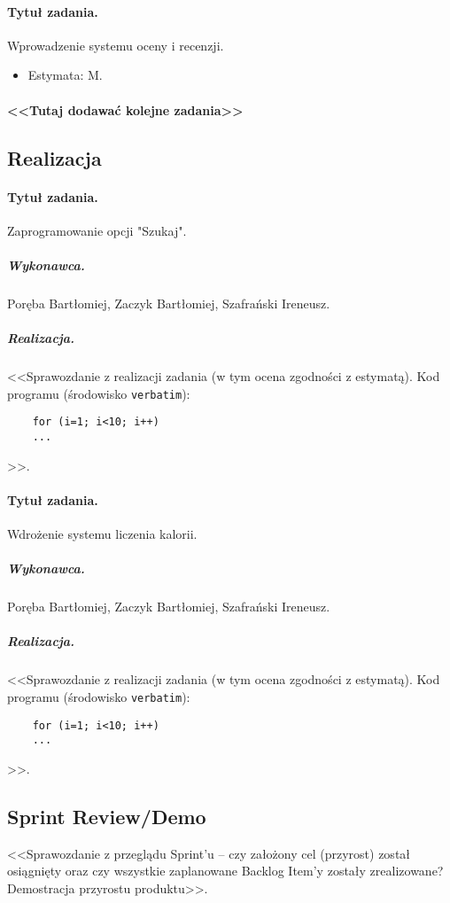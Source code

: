 \documentclass[a4paper]{article}
\begin{document}
	\paragraph{Tytuł zadania.} Wprowadzenie systemu oceny i recenzji.
	\begin{itemize}
		\item Estymata: M.
	\end{itemize}
	
	\paragraph{<<Tutaj dodawać kolejne zadania>>}
	
	\subsection{Realizacja}
	
	\paragraph{Tytuł zadania.} Zaprogramowanie opcji "Szukaj".
	\subparagraph{Wykonawca.} Poręba Bartłomiej, Zaczyk Bartłomiej, Szafrański Ireneusz.
	\subparagraph{Realizacja.} <<Sprawozdanie z realizacji zadania (w tym ocena zgodności z estymatą). Kod programu (środowisko \texttt{verbatim}): \begin{verbatim}
	for (i=1; i<10; i++)
	...
	\end{verbatim}>>.
	
	\paragraph{Tytuł zadania.} Wdrożenie systemu liczenia kalorii.
	\subparagraph{Wykonawca.} Poręba Bartłomiej, Zaczyk Bartłomiej, Szafrański Ireneusz.
	\subparagraph{Realizacja.} <<Sprawozdanie z realizacji zadania (w tym ocena zgodności z estymatą). Kod programu (środowisko \texttt{verbatim}): \begin{verbatim}
	for (i=1; i<10; i++)
	...
	\end{verbatim}>>.
	
	
	
	\subsection{Sprint Review/Demo}
	<<Sprawozdanie z przeglądu Sprint'u -- czy założony cel (przyrost) został osiągnięty oraz czy wszystkie zaplanowane Backlog Item'y zostały zrealizowane? Demostracja przyrostu produktu>>.
	
\end{document}
